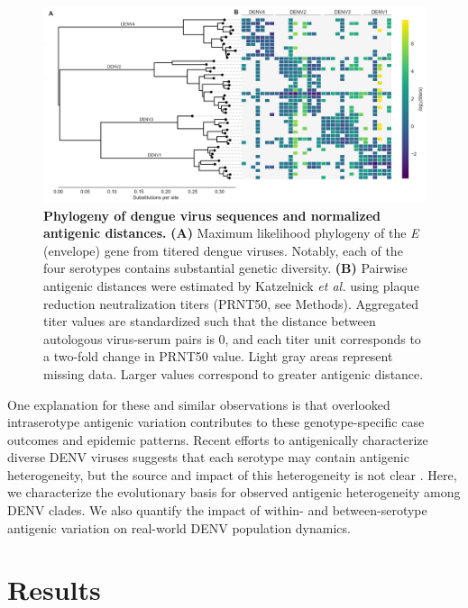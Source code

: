 \documentclass[11pt,oneside,letterpaper]{article}
\begin{document}
\begin{figure}[ht]
  \begin{centering}
    \includegraphics[width=\linewidth]{../figures/png/titer_tree_heatmap.png}
  	\caption{\textbf{Phylogeny of dengue virus sequences and normalized antigenic distances.}
    \textbf{(A)} Maximum likelihood phylogeny of the \textit{E} (envelope) gene from titered dengue viruses.
    Notably, each of the four serotypes contains substantial genetic diversity.
    \textbf{(B)} Pairwise antigenic distances were estimated by Katzelnick \textit{et al.} using plaque reduction neutralization titers (PRNT50, see Methods).
    Aggregated titer values are standardized such that the distance between autologous virus-serum pairs is 0, and each titer unit corresponds to a two-fold change in PRNT50 value.
    Light gray areas represent missing data.
    Larger values correspond to greater antigenic distance.
    }
  	\label{titer_tree_heatmap}
  \end{centering}
\end{figure}

One explanation for these and similar observations is that overlooked intraserotype antigenic variation contributes to these genotype-specific case outcomes and epidemic patterns.
Recent efforts to antigenically characterize diverse DENV viruses suggests that each serotype may contain antigenic heterogeneity, but the source and impact of this heterogeneity is not clear \citep{katzelnick2015dengue}.
Here, we characterize the evolutionary basis for observed antigenic heterogeneity among DENV clades.
We also quantify the impact of within- and between-serotype antigenic variation on real-world DENV population dynamics.

\section*{Results}
\end{document}
